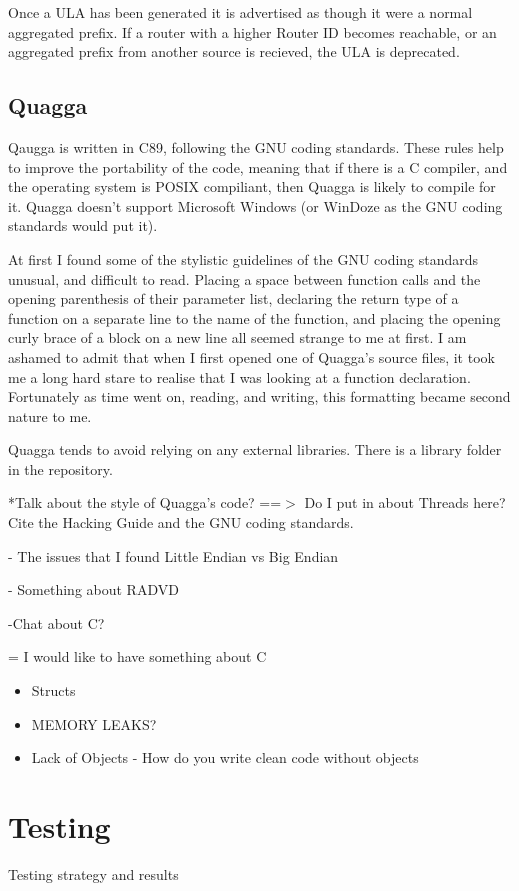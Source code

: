 \documentclass[12pt]{report}
\begin{document}
Once a ULA has been generated it is advertised as though it were a normal aggregated 
prefix. If a router with a higher Router ID becomes reachable, or an aggregated prefix from another source is recieved, the ULA is deprecated. 

\section{Quagga}
Qaugga is written in C89, following the GNU coding standards. These rules help to 
improve the portability of the code, meaning that if there is a C compiler, and the 
operating system is POSIX compiliant, then Quagga is likely to compile for it. 
Quagga doesn't support Microsoft Windows (or WinDoze as the GNU coding standards 
would put it). 

At first I found some of the stylistic guidelines of the GNU coding standards
unusual, and difficult to read. Placing a space between function calls and the 
opening parenthesis of their parameter list, declaring the return type of a function 
on a separate line to the name of the function, and placing the opening curly brace 
of a block on a new line all seemed strange to me at first. I am ashamed to admit 
that when I first opened one of Quagga's source files, it took me a long hard stare 
to realise that I was looking at a function declaration. Fortunately as time went
on, reading, and writing, this formatting became second nature to me. 

Quagga tends to avoid relying on any external libraries. There is a library folder in the repository.

*Talk about the style of Quagga's code?
==$>$ Do I put in about Threads here?
Cite the Hacking Guide and the GNU coding standards.

- The issues that I found
    Little Endian vs Big Endian
    
- Something about RADVD
    
-Chat about C?

= I would like to have something about C

\begin{itemize}
  \item Structs
  \item MEMORY LEAKS?
  \item Lack of Objects - How do you write clean code without objects
\end{itemize}

\chapter{Testing}
Testing strategy and results
\end{document}
